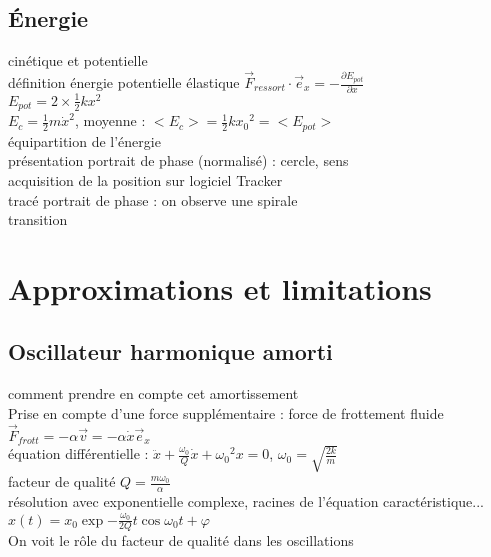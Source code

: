 \subsection{Énergie}
cinétique et potentielle \\
définition énergie potentielle élastique $\vec{F}_{ressort} \cdot \vec{e}_x = -\frac{\partial E_{pot}}{\partial x}$  \\
$E_{pot}=2 \times \frac{1}{2} k x^2 $ \\
$E_c=\frac{1}{2} m \dot{x}^2$, moyenne : $<E_c>=\frac{1}{2} k {x_{0}}^2=<E_{pot}>$ \\
équipartition de l'énergie \\
présentation portrait de phase (normalisé) : cercle, sens \\
acquisition de la position sur logiciel Tracker \\
tracé portrait de phase : on observe une spirale \\
transition \\

\section{Approximations et limitations}
\subsection{Oscillateur harmonique amorti}
comment prendre en compte cet amortissement \\
Prise en compte d'une force supplémentaire : force de frottement fluide $\vec{F}_{frott}=-\alpha \vec{v} = -\alpha \dot{x} \vec{e}_x$ \\
équation différentielle : $\ddot{x}+\frac{\omega_0}{Q} \dot{x} +{\omega_0}^{2} x = 0$, $\omega_0=\sqrt{\frac{2k}{m}}$ \\
 facteur de qualité $Q=\frac{m \omega_0}{\alpha}$\\
 résolution avec exponentielle complexe, racines de l'équation caractéristique... \\
 $x(t)=x_0 \exp{-\frac{\omega_0}{2Q}t} \cos{\omega_0 t + \varphi} $ \\
 On voit le rôle du facteur de qualité dans les oscillations \\

